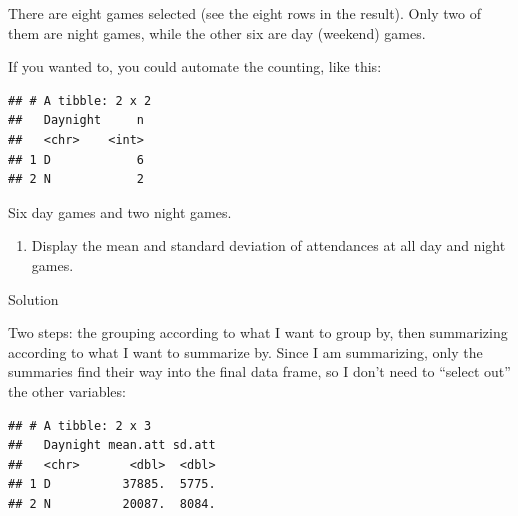 \documentclass[]{tufte-book}
\newenvironment{Shaded}{}{}
\newcommand{\DataTypeTok}[1]{\textcolor[rgb]{0.56,0.13,0.00}{#1}}
\newcommand{\DecValTok}[1]{\textcolor[rgb]{0.25,0.63,0.44}{#1}}
\newcommand{\KeywordTok}[1]{\textcolor[rgb]{0.00,0.44,0.13}{\textbf{#1}}}
\newcommand{\NormalTok}[1]{#1}
\newcommand{\OperatorTok}[1]{\textcolor[rgb]{0.40,0.40,0.40}{#1}}
\newcommand{\StringTok}[1]{\textcolor[rgb]{0.25,0.44,0.63}{#1}}
\providecommand{\tightlist}{%
  \setlength{\itemsep}{0pt}\setlength{\parskip}{0pt}}
\theoremstyle{definition}
\theoremstyle{definition}
\theoremstyle{definition}
\theoremstyle{remark}
\begin{document}
There are eight games selected (see the eight rows in the result). Only
two of them are night games, while the other six are day (weekend)
games.

If you wanted to, you could automate the counting, like this:

\begin{Shaded}
\end{Shaded}

\begin{verbatim}
## # A tibble: 2 x 2
##   Daynight     n
##   <chr>    <int>
## 1 D            6
## 2 N            2
\end{verbatim}

Six day games and two night games.

\begin{enumerate}
\def\labelenumi{(\alph{enumi})}
\setcounter{enumi}{3}
\tightlist
\item
  Display the mean and standard deviation of attendances at all day and
  night games.
\end{enumerate}

Solution

Two steps: the grouping according to what I want to group by, then
summarizing according to what I want to summarize by. Since I am
summarizing, only the summaries find their way into the final data
frame, so I don't need to ``select out'' the other variables:

\begin{Shaded}
\end{Shaded}

\begin{verbatim}
## # A tibble: 2 x 3
##   Daynight mean.att sd.att
##   <chr>       <dbl>  <dbl>
## 1 D          37885.  5775.
## 2 N          20087.  8084.
\end{verbatim}
\end{document}
